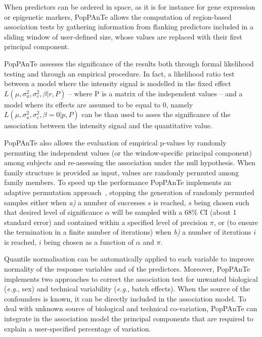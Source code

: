 \documentclass[a4paper,9pt]{article}
\begin{document}
\noindent
When predictors can be ordered in space, as it is for instance for gene expression or epigenetic markers, PopPAnTe allows the computation of region-based association tests by gathering information from flanking predictors included in a sliding window of user-defined size, whose values are replaced with their first principal component.


\vspace{0.3cm}

\noindent
PopPAnTe assesses the significance of the results both through formal likelihood testing and through an empirical procedure. 
In fact, a likelihood ratio test between a model where the intensity signal is modelled in the fixed
effect $L(\mu, \sigma_a^2, \sigma_e^2 , \beta | r, P)$ -- where P is a matrix of the independent values -- and a model where its effects are assumed to be equal to 0, namely $L(\mu, \sigma_a^2, \sigma_e^2 , \beta=0 | p, P)$ can be than used to asses the significance of the association between the intensity signal and the  quantitative value.

\noindent
PopPAnTe also allows the evaluation of empirical p-values by randomly permuting the independent values (or the window-specific principal component) among subjects and re-assessing the association under the null hypothesis. When family structure is provided as input, values are randomly permuted among family members. To speed up the performance PopPAnTe implements an adaptive permutation approach~\cite{adaptive}, stopping the generation of randomly permuted samples either when \emph{a)} a number of successes $s$ is reached, $s$ being chosen such that desired level of significance $\alpha$ will be sampled with a 68\% CI  (about 1 standard error) and contained within a specified level of precision $\pi$, or (to ensure the termination in a finite number of iterations) when \emph{b)} a number of iterations $i$ is reached, $i$ being chosen as a function of $\alpha$ and $\pi$.

\newpage

\noindent
Quantile normalisation can be automatically applied to each variable to improve normality of the response variables and of the predictors. Moreover, PopPAnTe implements two approaches to correct the association test for unwanted biological (\emph{e.g.}, sex) and technical variability (\emph{e.g.}, batch effects). When the source of the confounders is known, it can be directly included in the association model. To deal with unknown source of biological and technical co-variation, PopPAnTe can integrate in the association model the principal components that are required to explain a user-specified percentage of variation.
\end{document}
